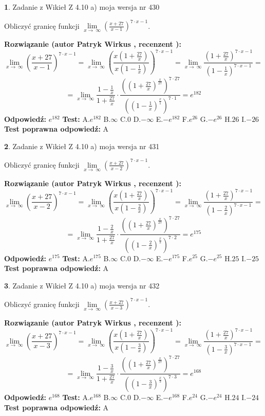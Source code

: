 \documentclass[12pt, a4paper]{article}
\theoremstyle{definition} %
\newtheorem{zad}{}
\newcommand{\zadStart}[1]{\begin{zad}#1\newline}
\newcommand{\zadStop}{\end{zad}}
\newcommand{\rozwStart}[2]{\noindent \textbf{Rozwiązanie (autor #1 , recenzent #2): }\newline}
\newcommand{\rozwStop}{\newline}
\newcommand{\odpStart}{\noindent \textbf{Odpowiedź:}\newline}
\newcommand{\odpStop}{\newline}
\newcommand{\testStart}{\noindent \textbf{Test:}\newline}
\newcommand{\testStop}{\newline}
\newcommand{\kluczStart}{\noindent \textbf{Test poprawna odpowiedź:}\newline}
\newcommand{\kluczStop}{\newline}
\begin{document}
\zadStart{Zadanie z Wikieł Z 4.10 a) moja wersja nr 430}

Obliczyć granicę funkcji  $\lim\limits_{x\to\ \infty}(\frac{x+27}{x-1})^{7\cdot x-1}$.
\zadStop
\rozwStart{Patryk Wirkus}{}
$$\lim\limits_{x\to\ \infty}(\frac{x+27}{x-1})^{7\cdot x-1} = \lim\limits_{x\to\ \infty}(\frac{x(1+\frac{27}{x})}{x(1-\frac{1}{x})})^{7\cdot x-1}=\lim\limits_{x\to\ \infty}\frac{(1+\frac{27}{x})^{7\cdot x-1}}{(1-\frac{1}{x})^{7\cdot x-1}}=$$
$$=\lim\limits_{x\to\ \infty}\frac{1-\frac{1}{x}}{1+\frac{27}{x}}\cdot\frac{((1+\frac{27}{x})^{\frac{x}{27}})^{7\cdot27}}{((1-\frac{1}{x})^{\frac{x}{1}})^{7\cdot1}}=e^{182}$$
\rozwStop
\odpStart
$e^{182}$
\odpStop
\testStart
A.$e^{182}$ B.$\infty$ C.$0$ D.$-\infty$ E.$-e^{182}$
F.$e^{26}$ G.$-e^{26}$
H.$26$
I.$-26$
\testStop
\kluczStart
A
\kluczStop



\zadStart{Zadanie z Wikieł Z 4.10 a) moja wersja nr 431}

Obliczyć granicę funkcji  $\lim\limits_{x\to\ \infty}(\frac{x+27}{x-2})^{7\cdot x-1}$.
\zadStop
\rozwStart{Patryk Wirkus}{}
$$\lim\limits_{x\to\ \infty}(\frac{x+27}{x-2})^{7\cdot x-1} = \lim\limits_{x\to\ \infty}(\frac{x(1+\frac{27}{x})}{x(1-\frac{2}{x})})^{7\cdot x-1}=\lim\limits_{x\to\ \infty}\frac{(1+\frac{27}{x})^{7\cdot x-1}}{(1-\frac{2}{x})^{7\cdot x-1}}=$$
$$=\lim\limits_{x\to\ \infty}\frac{1-\frac{2}{x}}{1+\frac{27}{x}}\cdot\frac{((1+\frac{27}{x})^{\frac{x}{27}})^{7\cdot27}}{((1-\frac{2}{x})^{\frac{x}{2}})^{7\cdot2}}=e^{175}$$
\rozwStop
\odpStart
$e^{175}$
\odpStop
\testStart
A.$e^{175}$ B.$\infty$ C.$0$ D.$-\infty$ E.$-e^{175}$
F.$e^{25}$ G.$-e^{25}$
H.$25$
I.$-25$
\testStop
\kluczStart
A
\kluczStop



\zadStart{Zadanie z Wikieł Z 4.10 a) moja wersja nr 432}

Obliczyć granicę funkcji  $\lim\limits_{x\to\ \infty}(\frac{x+27}{x-3})^{7\cdot x-1}$.
\zadStop
\rozwStart{Patryk Wirkus}{}
$$\lim\limits_{x\to\ \infty}(\frac{x+27}{x-3})^{7\cdot x-1} = \lim\limits_{x\to\ \infty}(\frac{x(1+\frac{27}{x})}{x(1-\frac{3}{x})})^{7\cdot x-1}=\lim\limits_{x\to\ \infty}\frac{(1+\frac{27}{x})^{7\cdot x-1}}{(1-\frac{3}{x})^{7\cdot x-1}}=$$
$$=\lim\limits_{x\to\ \infty}\frac{1-\frac{3}{x}}{1+\frac{27}{x}}\cdot\frac{((1+\frac{27}{x})^{\frac{x}{27}})^{7\cdot27}}{((1-\frac{3}{x})^{\frac{x}{3}})^{7\cdot3}}=e^{168}$$
\rozwStop
\odpStart
$e^{168}$
\odpStop
\testStart
A.$e^{168}$ B.$\infty$ C.$0$ D.$-\infty$ E.$-e^{168}$
F.$e^{24}$ G.$-e^{24}$
H.$24$
I.$-24$
\testStop
\kluczStart
A
\kluczStop
\end{document}
